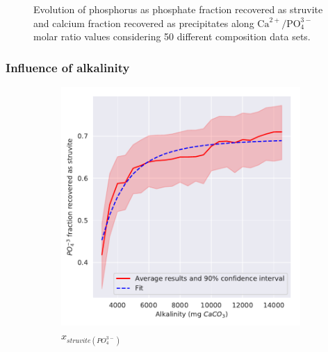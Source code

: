 \begin{refsection}[referencesCh3]
\begin{figure}[h]
	\caption{Evolution of phosphorus as phosphate fraction recovered as struvite and calcium fraction recovered as precipitates along $\text{Ca}^{2+}/\text{PO}_{4}^{3-}$ molar ratio values considering 50 different composition data sets.}
	\label{fig:estimation_Ca_ca}
\end{figure}

\clearpage
\subsubsection{Influence of alkalinity}
\begin{figure}[h] 
	\centering
	\begin{subfigure}[t]{0.25\textheight}
		\includegraphics[width=\textwidth]{gfx/AppendixB/plotStrYield_Alk}
		\caption{$x_{struvite \left(PO_{4}^{3-}\right)}$}
		\label{fig:estimation_Alk_struviteYield}
	\end{subfigure}
	\begin{subfigure}[t]{0.25\textheight}

\end{subfigure}
\end{figure}
\end{refsection}
